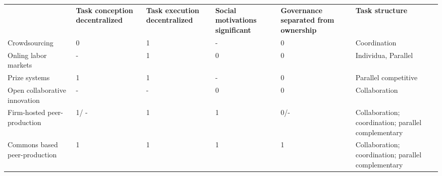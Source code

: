 \begin{table}[h]
\begin{tabular}{llllll}
                              & \textbf{Task conception decentralized} & \textbf{Task execution decentralized} & \textbf{Social motivations significant} & \textbf{Governance separated from ownership} & \textbf{Task structure}                             \\
Crowdsourcing                 & 0                                      & 1                                     & -                                       & 0                                            & Coordination                                        \\ \cline{5-5}
\rowcolor[HTML]{C0C0C0} 
Onling labor markets          & -                                      & 1                                     & 0                                       & 0                                            & Individua, Parallel                                 \\
Prize systems                 & 1                                      & 1                                     & -                                       & 0                                            & Parallel competitive                                \\
\rowcolor[HTML]{C0C0C0} 
Open collaborative innovation & -                                      & -                                     & 0                                       & 0                                            & Collaboration                                       \\
Firm-hosted peer-production   & 1/ -                                   & 1                                     & 1                                       & 0/-                                          & Collaboration; coordination; parallel complementary \\
\rowcolor[HTML]{C0C0C0} 
Commons based peer-production & 1                                      & 1                                     & 1                                       & 1                                            & Collaboration; coordination; parallel complementary
\end{tabular}
\end{table}